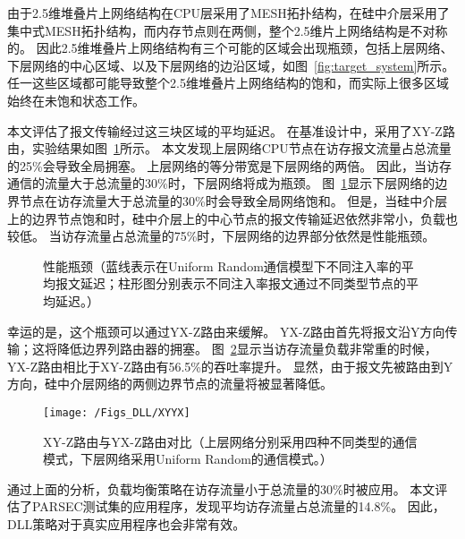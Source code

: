 由于2.5维堆叠片上网络结构在CPU层采用了MESH拓扑结构，在硅中介层采用了集中式MESH拓扑结构，而内存节点则在两侧，整个2.5维片上网络结构是不对称的。
因此2.5维堆叠片上网络结构有三个可能的区域会出现瓶颈，包括上层网络、下层网络的中心区域、以及下层网络的边沿区域，如图~\ref{fig:target_system}所示。
任一这些区域都可能导致整个2.5维堆叠片上网络结构的饱和，而实际上很多区域始终在未饱和状态工作。

本文评估了报文传输经过这三块区域的平均延迟。
在基准设计中，采用了XY-Z路由，实验结果如图~\ref{fig:bottleneck}所示。
本文发现上层网络CPU节点在访存报文流量占总流量的25\%会导致全局拥塞。
上层网络的等分带宽是下层网络的两倍。
因此，当访存通信的流量大于总流量的30\%时，下层网络将成为瓶颈。
图~\ref{fig:bottleneck}显示下层网络的边界节点在访存流量大于总流量的30\%时会导致全局网络饱和。
但是，当硅中介层上的边界节点饱和时，硅中介层上的中心节点的报文传输延迟依然非常小，负载也较低。
当访存流量占总流量的75\%时，下层网络的边界部分依然是性能瓶颈。

\begin{figure}[htb]
\centering
{} 
\qquad
{}
\caption{性能瓶颈（蓝线表示在Uniform Random通信模型下不同注入率的平均报文延迟；柱形图分别表示不同注入率报文通过不同类型节点的平均延迟。）}
\label{fig:bottleneck}
\end{figure}


幸运的是，这个瓶颈可以通过YX-Z路由来缓解。
YX-Z路由首先将报文沿Y方向传输；这将降低边界列路由器的拥塞。
图~\ref{fig:XYYX}显示当访存流量负载非常重的时候，YX-Z路由相比于XY-Z路由有56.5\%的吞吐率提升。
显然，由于报文先被路由到Y方向，硅中介层网络的两侧边界节点的流量将被显著降低。

\begin{figure}[htbp] %
  \centering
  \texttt{[image: /Figs\_DLL/XYYX]}
  \caption{XY-Z路由与YX-Z路由对比（上层网络分别采用四种不同类型的通信模式，下层网络采用Uniform Random的通信模式。）}
  \label{fig:XYYX}
\end{figure}

通过上面的分析，负载均衡策略在访存流量小于总流量的30\%时被应用。
本文评估了PARSEC测试集的应用程序，发现平均访存流量占总流量的14.8\%。
因此，DLL策略对于真实应用程序也会非常有效。

